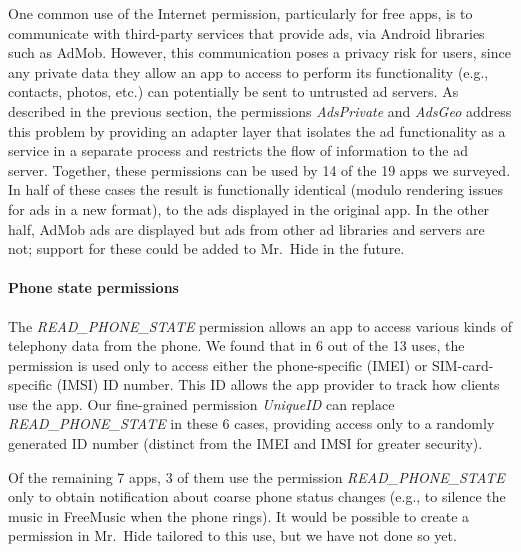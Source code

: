 \documentclass[preprint]{sig-alternate-10pt}
\newcommand{\lib}{Mr.\ Hide\xspace}
\newcommand{\perm}[1]{\textsf{\textit{#1}}}
\newcommand{\comment}[3][\color{red}]{}%
\newcommand{\tdm}[1]{\comment[\color{red}]{TDM}{#1}}
\newcommand{\jeff}[1]{\comment[\color{green}]{JSF}{#1}}
\newcommand{\jsjeon}[1]{\comment[\color{red}]{JJ}{#1}}
\newcommand{\polAdsBlindName}{\perm{AdsPrivate}\xspace}
\newcommand{\polAdsGeoName}{\perm{AdsGeo}\xspace}
\begin{document}
One common use of the Internet permission, particularly for free apps, is to communicate with
third-party services that provide ads, via Android libraries such as AdMob.
However, this communication poses a privacy risk for users, since any
private data they allow an app to access to perform its
functionality (e.g., contacts, photos, etc.) can potentially be
sent to untrusted ad servers.  
As described in the previous section, the permissions \polAdsBlindName and
\polAdsGeoName address this problem by providing an adapter layer that
isolates the ad functionality as a service in a separate
process and restricts the flow of information to the ad server.
Together, these permissions can be used by 14 of the 19 apps we
surveyed.  In half of these cases the result is functionally identical 
(modulo rendering issues for ads in a new format),
to the ads displayed in the original app.  In the other half, AdMob
ads are displayed but ads from other ad libraries and
servers are not; support for
these could be added to \lib in the future.  


\paragraph*{Phone state permissions}  The \perm{READ\_PHONE\_STATE}
permission allows an app to access various kinds of telephony data from the
phone.  We found that in 6 out of the 13 uses,
the permission is used only to access either the phone-specific
(IMEI) or SIM-card-specific (IMSI) ID number.  This ID allows the app provider
to track how clients use the app.  Our fine-grained permission
\perm{UniqueID} can replace  \perm{READ\_PHONE\_STATE} in these 6 cases,
providing access only to a randomly generated ID number (distinct from
the IMEI and IMSI for greater security).

Of the remaining 7 apps, 3 of them use the permission
\perm{READ\_PHONE\_STATE}  only to
obtain notification about coarse phone status changes (e.g., to
silence the music in FreeMusic when the phone rings).  It would be
possible to create a permission in \lib tailored to this use, but we
have not done so yet.
\end{document}
